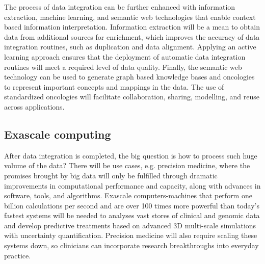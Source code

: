 \documentclass[sigconf]{acmart}
\begin{document}
The process of data integration can be further enhanced with 
information extraction, machine learning, and semantic web 
technologies that enable context based information interpretation.
Information extraction will be a mean to obtain data from additional
sources for enrichment, which improves the accuracy of data 
integration routines, such as duplication and data alignment. 
Applying an active learning approach ensures that the deployment of
automatic data integration routines will meet a required level of 
data quality. Finally, the semantic web technology can be used to 
generate graph based knowledge bases and oncologies to represent 
important concepts and mappings in the data. The use of standardized 
oncologies will facilitate collaboration, sharing, modelling, and 
reuse across applications\cite{TR04}.

\subsection{Exascale computing}
After data integration is completed, the big question is how to process
such huge volume of the data? There will be use cases, e.g. precision
medicine, where the promises brought by big data will only be fulfilled
through dramatic improvements in computational performance and capacity,
along with advances in software, tools, and algorithms. Exascale
computers-machines that perform one billion calculations per second and
are over 100 times more powerful than today's fastest systems will be
needed to analyses vast stores of clinical and genomic data and develop
predictive treatments based on advanced 3D multi-scale simulations with
uncertainty quantification. Precision medicine will also require scaling
these systems down, so clinicians can incorporate research breakthroughs
into everyday practice\cite{TR04}.
\end{document}
